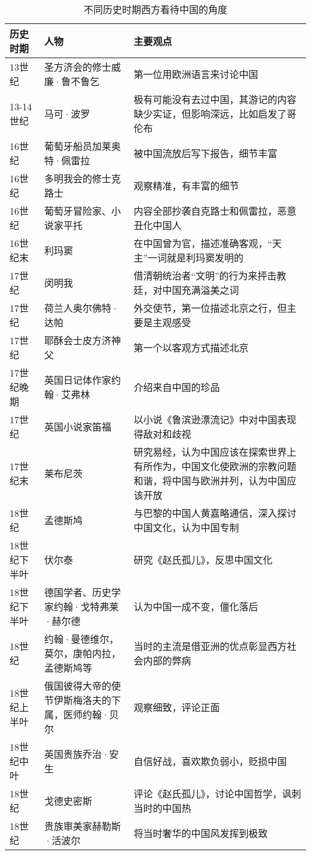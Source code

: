 \begin{longtable}{p{}|p{}|p{}}
\caption{不同历史时期西方看待中国的角度}\\
\hline
历史时期 & 人物 & 主要观点 \\
\hline
\endhead

13世纪 & 圣方济会的修士威廉·鲁不鲁乞 & 第一位用欧洲语言来讨论中国 \\
13-14世纪 & 马可·波罗 & 极有可能没有去过中国，其游记的内容缺少实证，但影响深远，比如启发了哥伦布 \\
16世纪 & 葡萄牙船员加莱奥特·佩雷拉 & 被中国流放后写下报告，细节丰富 \\
16世纪 & 多明我会的修士克路士 & 观察精准，有丰富的细节 \\
16世纪 & 葡萄牙冒险家、小说家平托 & 内容全部抄袭自克路士和佩雷拉，恶意丑化中国人 \\
16世纪末 & 利玛窦 & 在中国曾为官，描述准确客观，“天主”一词就是利玛窦发明的 \\
17世纪 & 闵明我 & 借清朝统治者“文明”的行为来抨击教廷，对中国充满溢美之词 \\
17世纪 & 荷兰人奥尔佛特·达帕 & 外交使节，第一位描述北京之行，但主要是主观感受 \\
17世纪 & 耶酥会士皮方济神父 & 第一个以客观方式描述北京 \\
17世纪晚期 & 英国日记体作家约翰·艾弗林 & 介绍来自中国的珍品 \\
17世纪 & 英国小说家笛福 & 以小说《鲁滨逊漂流记》中对中国表现得敌对和歧视 \\
17世纪末 & 莱布尼茨 & 研究易经，认为中国应该在探索世界上有所作为，中国文化使欧洲的宗教问题和谐，将中国与欧洲并列，认为中国应该开放 \\
18世纪 & 孟德斯鸠 & 与巴黎的中国人黄嘉略通信，深入探讨中国文化，认为中国专制 \\
18世纪下半叶 & 伏尔泰 & 研究《赵氏孤儿》，反思中国文化 \\
18世纪下半叶 & 德国学者、历史学家约翰·戈特弗莱·赫尔德 & 认为中国一成不变，僵化落后 \\
18世纪 & 约翰·曼德维尔，莫尔，康帕内拉，孟德斯鸠等 & 当时的主流是借亚洲的优点彰显西方社会内部的弊病 \\
18世纪上半叶 & 俄国彼得大帝的使节伊斯梅洛夫的下属，医师约翰·贝尔 & 观察细致，评论正面 \\
18世纪中叶 & 英国贵族乔治·安生 & 自信好战，喜欢欺负弱小，贬损中国 \\
18世纪 & 戈德史密斯 & 评论《赵氏孤儿》，讨论中国哲学，讽刺当时的中国热 \\
18世纪 & 贵族审美家赫勒斯·活波尔 & 将当时奢华的中国风发挥到极致 \\

\end{longtable}
